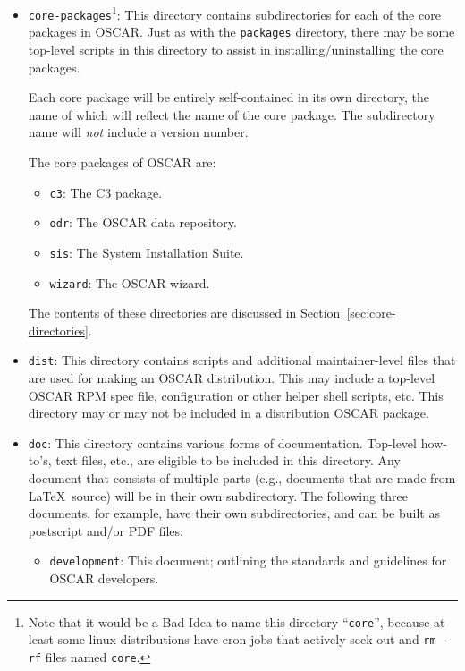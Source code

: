 \begin{itemize}
  
\item {\tt core-packages}\footnote{Note that it would be a Bad Idea to
    name this directory ``{\tt core}'', because at least some linux
    distributions have cron jobs that actively seek out and {\tt rm
      -rf} files named {\tt core}.}: This directory contains
  subdirectories for each of the core packages in OSCAR.  Just as with
  the {\tt packages} directory, there may be some top-level scripts in
  this directory to assist in installing/uninstalling the core
  packages.

  Each core package will be entirely self-contained in its own
  directory, the name of which will reflect the name of the core
  package.  The subdirectory name will {\em not} include a version
  number.

  The core packages of OSCAR are:

  \begin{itemize}
  \item {\tt c3}: The C3 package.
  \item {\tt odr}: The OSCAR data repository.
  \item {\tt sis}: The System Installation Suite.
  \item {\tt wizard}: The OSCAR wizard.
  \end{itemize}
  
  The contents of these directories are discussed in
  Section~\ref{sec:core-directories}.
  
\item {\tt dist}: This directory contains scripts and additional
  maintainer-level files that are used for making an OSCAR
  distribution.  This may include a top-level OSCAR RPM spec file,
  configuration or other helper shell scripts, etc.  This directory
  may or may not be included in a distribution OSCAR package.
  
\item {\tt doc}: This directory contains various forms of
  documentation.  Top-level how-to's, text files, etc., are eligible
  to be included in this directory.  Any document that consists of
  multiple parts (e.g., documents that are made from \LaTeX\ source)
  will be in their own subdirectory.  The following three documents,
  for example, have their own subdirectories, and can be built as
  postscript and/or PDF files:

  \begin{itemize}
  \item {\tt development}: This document; outlining the standards and
    guidelines for OSCAR developers.


\end{itemize}
\end{itemize}
